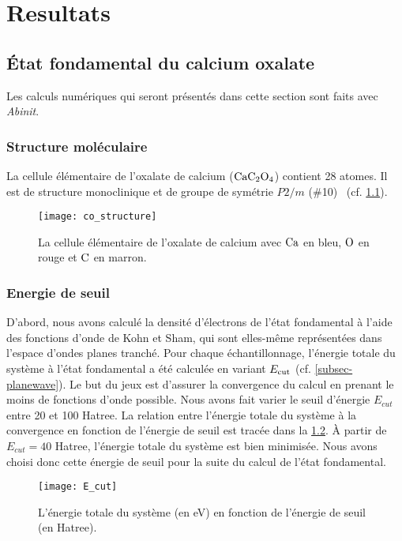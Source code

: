 \chapter{Resultats}
\label{chap-results}

\section{État fondamental du calcium oxalate}
Les calculs numériques qui seront présentés dans cette section sont faits avec \textit{Abinit}.

\subsection{Structure moléculaire}
La cellule élémentaire de l'oxalate de calcium ($\textnormal{Ca} \textnormal{C}_2 \textnormal{O}_4$) contient 28 atomes.
Il est de structure monoclinique et de groupe de symétrie $P2/m$ ($\#$10)~\cite{Kolezynski2010} (cf. \cref{BrillouinZone}).

\begin{figure}[!h]
  \centering
  \texttt{[image: co\_structure]}
  \caption{La cellule élémentaire de l'oxalate de calcium avec $\textnormal{Ca}$ en bleu, $\textnormal{O}$ en rouge et $\textnormal{C}$ en marron.}\label{BrillouinZone}
\end{figure}

\subsection{Energie de seuil}
D'abord, nous avons calculé la densité d'électrons de l'état fondamental
à l'aide des fonctions d'onde de Kohn et Sham,
qui sont elles-même représentées dans l'espace d'ondes planes tranché.
Pour chaque échantillonnage, l'énergie totale du système à l'état fondamental a été calculée
en variant $E_{\textnormal{cut}}$ (cf. \cref{subsec-planewave}).
Le but du jeux est d'assurer la convergence du calcul en prenant le moins de fonctions d'onde possible.
Nous avons fait varier le seuil d'énergie $E_{cut}$ entre 20 et 100 Hatree.
La relation entre l'énergie totale du système à la convergence
en fonction de l'énergie de seuil est tracée dans la \cref{fig-Ecut}.
À partir de $E_{cut} = 40$ Hatree, l'énergie totale du système est bien minimisée.
Nous avons choisi donc cette énergie de seuil pour la suite du calcul de l'état fondamental.

\begin{figure}[!h]
    \centering
    \texttt{[image: E\_cut]}
    \caption{L'énergie totale du système (en eV) en fonction de l'énergie de seuil (en Hatree).}\label{fig-Ecut}
\end{figure}

